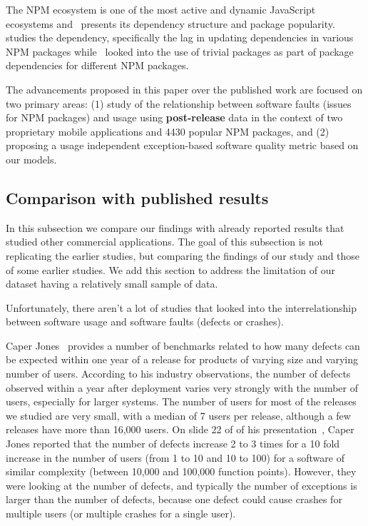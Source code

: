 \documentclass[smallcondensed]{svjour3}     %
\begin{document}
The NPM ecosystem is one of the most active and dynamic JavaScript ecosystems and~\cite{wittern2016look} presents its dependency structure and package popularity.~\cite{zerouali2018empirical} studies the dependency, specifically the lag in updating dependencies in various NPM packages while~\cite{abdalkareem2017developers} looked into the use of trivial packages as part of package dependencies for different NPM packages. 


The advancements proposed in this paper over the published work are focused 
on two primary areas: (1) study of the relationship between software faults (issues for NPM packages) and usage using \textbf{post-release} data in the context of two proprietary mobile applications and 4430 popular NPM packages, and (2) proposing a usage independent exception-based software quality metric based on our models.

\vspace{-20pt}
\subsection{Comparison with published results}
In this subsection we compare our findings with already reported results that studied other commercial applications. The goal of this subsection is not replicating the earlier studies, but  
comparing the findings of our study and those of some earlier studies. We add this section to address 
the limitation of our dataset having a relatively small sample of data. 

Unfortunately, there aren't a lot of studies that looked into the interrelationship between software usage and software faults (defects or crashes).

Caper Jones~\cite{caper} provides a number of benchmarks related to how many defects can be expected within one year of a release for products of varying size and varying number of users. According to his industry observations, the number of defects observed within a year after deployment varies very strongly with the number of users, especially for larger systems. 
The number of users for most of the releases we studied are very small, with a 
median of 7 users per release, although a few releases have more than 16,000 users.
On slide 22 of of his presentation~\cite{caper}, Caper Jones reported that the
number of defects increase 2 to 3 times for a 10 fold increase in the number of users
(from 1 to 10 and 10 to 100) for a software of similar complexity (between 10,000
and 100,000 function points). However, they were looking at the number of 
defects, and typically the number of 
exceptions is larger than the number of defects, because one defect could cause crashes for multiple users (or multiple crashes for a single user).
\end{document}
